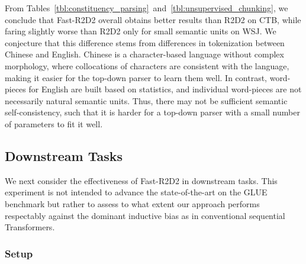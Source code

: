 From Tables~\ref{tbl:constituency_parsing}~and~\ref{tbl:unsupervised_chunking}, 
we conclude that Fast-R2D2 overall obtains better results than R2D2 on CTB, while faring slightly worse than R2D2 only for small semantic units on WSJ. We conjecture that this difference stems from differences in  tokenization between Chinese and English. 
Chinese is a character-based language without complex morphology, where collocations of characters are consistent with the language, making it easier for the top-down parser to learn them well. 
In contrast, word-pieces for English are built based on statistics, and individual word-pieces are not necessarily natural semantic units. Thus, there may not be sufficient semantic self-consistency, such that it is harder for a top-down parser with a small number of parameters to fit it well.

\subsection{Downstream Tasks}
We next consider the effectiveness of Fast-R2D2 in downstream tasks. This experiment is not intended to advance the state-of-the-art on the GLUE benchmark but rather to assess to what extent our approach performs respectably against the dominant inductive bias as in conventional sequential Transformers.

\subsubsection{Setup}
